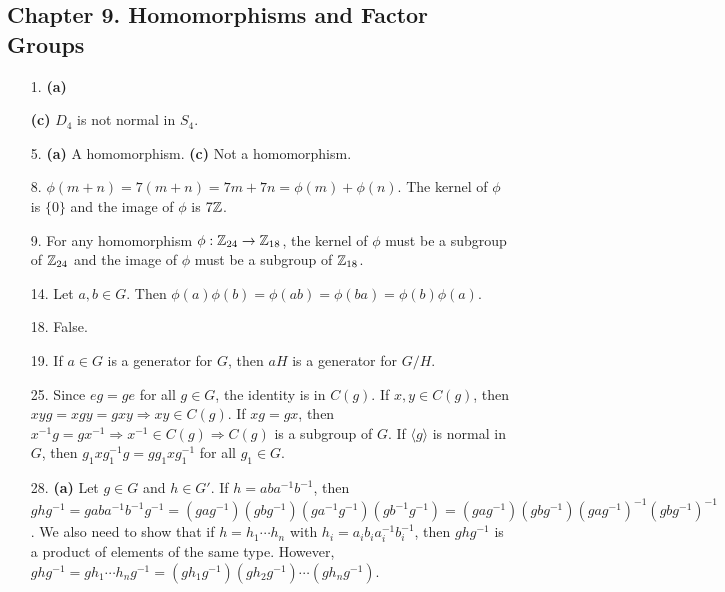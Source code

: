 \subsection*{Chapter 9. Homomorphisms and Factor Groups}
 
{\small
\begin{itemize}
 
\bf\item[1.]\rm
{\bf (a)}

{\bf (c)} $D_4$ is not normal in $S_4$.
 
 
\bf\item[5.]\rm
{\bf (a)} A homomorphism.
{\bf (c)} Not a homomorphism.
 
 
\bf\item[8.]\rm
$\phi(m + n) = 7(m+n) = 7m + 7n = \phi(m) + \phi(n)$. The kernel of
$\phi$ is $\{ 0 \}$ and the image of $\phi$ is $7{\Bbb Z}$.
 
 
\bf\item[9.]\rm
For any homomorphism $\phi : {\Bbb Z}_{24} \rightarrow {\Bbb
Z}_{18}$, the kernel of $\phi$ must be a subgroup of ${\Bbb Z}_{24}$
and the image of $\phi$ must be a subgroup of ${\Bbb Z}_{18}$.
 
 
\bf\item[14.]\rm
Let $a, b \in G$. Then $\phi(a) \phi(b) = \phi(ab) = \phi(ba) =
\phi(b)\phi(a)$. 
 
\bf\item[18.]\rm
False.
 
\bf\item[19.]\rm
If $a \in G$ is a generator for $G$, then $aH$ is a generator for $G/H$.
 
\bf\item[25.]\rm
Since $eg = ge$ for all $g \in G$, the identity is in $C(g)$. If $x,
y \in C(g)$, then $xy g = x g y = g xy \Rightarrow xy \in C(g)$.  If
$x g = g x$, then $x^{-1} g = g x^{-1} \Rightarrow x^{-1} \in C(g)
\Rightarrow C(g)$ is a subgroup of $G$. If $\langle g \rangle$ is
normal in $G$, then $g_1 x g_1^{-1} g = g g_1 x g_1^{-1}$ for all $g_1
\in G$.
 
\bf\item[28.]\rm
{\bf (a)}
Let $g \in G$ and $h \in G'$. If $h = aba^{-1}b^{-1}$, then $ghg^{-1}
= gaba^{-1}b^{-1}g^{-1} 
= (gag^{-1})(gbg^{-1})(ga^{-1}g^{-1})(gb^{-1}g^{-1}) 
= (gag^{-1})(gbg^{-1})(gag^{-1})^{-1}(gbg^{-1})^{-1}$. We also need to
show that if $h = h_1 \cdots h_n$ with $h_i = a_i b_i a_i^{-1}
b_i^{-1}$, then $ghg^{-1}$ is a product of elements of the same type.
However, $ghg^{-1} = g h_1 \cdots h_n g^{-1} =
(gh_1g^{-1})(gh_2g^{-1}) \cdots (gh_ng^{-1})$.
 
 
 
 
\end{itemize}
}
 
